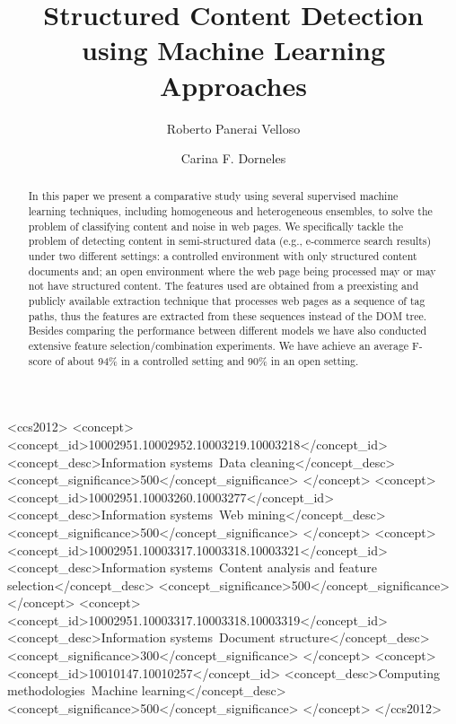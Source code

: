 \documentclass[sigconf,10pt]{acmart}
\begin{document}
\acmDOI{}\acmISBN{}

\fancyhead{}

\title{Structured Content Detection using Machine Learning Approaches}

\author{Roberto Panerai Velloso}

\author{Carina F. Dorneles}

\begin{abstract}
    In this paper we present a comparative study using several supervised 
    machine learning techniques, including homogeneous and heterogeneous
    ensembles, to solve the problem of classifying content and noise in web
    pages. We specifically tackle the problem of detecting content in 
    semi-structured data (e.g., e-commerce 
    search results) under two different
    settings: a controlled environment with only structured content documents
    and; an open environment where the web page being processed may or may
    not have structured content.
    The features used are obtained from a preexisting and publicly available extraction 
    technique that processes web pages as a sequence of tag paths, thus 
    the features are extracted from these sequences instead of the DOM 
    tree. Besides comparing the performance between different models 
    we have also conducted extensive feature selection/combination 
    experiments. We have achieve an average F-score of about
    94\% in a controlled setting and 90\% in an open setting.
\end{abstract}

%
%
\begin{CCSXML}
<ccs2012>
<concept>
<concept_id>10002951.10002952.10003219.10003218</concept_id>
<concept_desc>Information systems~Data cleaning</concept_desc>
<concept_significance>500</concept_significance>
</concept>
<concept>
<concept_id>10002951.10003260.10003277</concept_id>
<concept_desc>Information systems~Web mining</concept_desc>
<concept_significance>500</concept_significance>
</concept>
<concept>
<concept_id>10002951.10003317.10003318.10003321</concept_id>
<concept_desc>Information systems~Content analysis and feature selection</concept_desc>
<concept_significance>500</concept_significance>
</concept>
<concept>
<concept_id>10002951.10003317.10003318.10003319</concept_id>
<concept_desc>Information systems~Document structure</concept_desc>
<concept_significance>300</concept_significance>
</concept>
<concept>
<concept_id>10010147.10010257</concept_id>
<concept_desc>Computing methodologies~Machine learning</concept_desc>
<concept_significance>500</concept_significance>
</concept>
</ccs2012>
\end{CCSXML}
\end{document}
